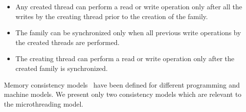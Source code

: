 \documentclass{article}
\begin{document}
\begin{itemize}

\item Any created thread can perform a read or write operation only after all
    the writes by the creating thread prior to the creation of the family.

\item The family can be synchronized only when all previous write operations by
    the created threads are performed.

\item The creating thread can perform a read or write operation only after the
    created family is synchronized.

\end{itemize}

Memory consistency models~\cite{Gharachorloo:1990:MCE:325096.325102,
Mosberger:1993:MCM:160551.160553} have been defined for different programming
and machine models. We present only two consistency models which are relevant
to the microthreading model.
\end{document}
